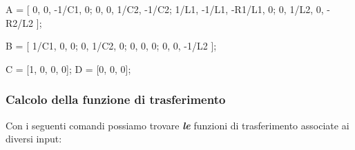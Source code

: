 \documentclass[
]{article}
\newenvironment{Shaded}{}{}
\newcommand{\FloatTok}[1]{\textcolor[rgb]{0.25,0.63,0.44}{#1}}
\newcommand{\NormalTok}[1]{#1}
\newcommand{\OperatorTok}[1]{\textcolor[rgb]{0.40,0.40,0.40}{#1}}
\newcommand{\VariableTok}[1]{\textcolor[rgb]{0.10,0.09,0.49}{#1}}
\begin{document}
\begin{Shaded}
\begin{Highlighting}[]
\VariableTok{A} \OperatorTok{=}\NormalTok{ [   }\FloatTok{0}\OperatorTok{,}      \FloatTok{0}\OperatorTok{,}      \OperatorTok{{-}}\FloatTok{1}\OperatorTok{/}\VariableTok{C1}\OperatorTok{,}      \FloatTok{0}\OperatorTok{;}
        \FloatTok{0}\OperatorTok{,}      \FloatTok{0}\OperatorTok{,}      \FloatTok{1}\OperatorTok{/}\VariableTok{C2}\OperatorTok{,}       \OperatorTok{{-}}\FloatTok{1}\OperatorTok{/}\VariableTok{C2}\OperatorTok{;}
        \FloatTok{1}\OperatorTok{/}\VariableTok{L1}\OperatorTok{,}   \OperatorTok{{-}}\FloatTok{1}\OperatorTok{/}\VariableTok{L1}\OperatorTok{,}  \OperatorTok{{-}}\VariableTok{R1}\OperatorTok{/}\VariableTok{L1}\OperatorTok{,}      \FloatTok{0}\OperatorTok{;}
        \FloatTok{0}\OperatorTok{,}      \FloatTok{1}\OperatorTok{/}\VariableTok{L2}\OperatorTok{,}   \FloatTok{0}\OperatorTok{,}          \OperatorTok{{-}}\VariableTok{R2}\OperatorTok{/}\VariableTok{L2}
\NormalTok{    ]}\OperatorTok{;}

\VariableTok{B} \OperatorTok{=}\NormalTok{ [   }\FloatTok{1}\OperatorTok{/}\VariableTok{C1}\OperatorTok{,}   \FloatTok{0}\OperatorTok{,}      \FloatTok{0}\OperatorTok{;}
        \FloatTok{0}\OperatorTok{,}      \FloatTok{1}\OperatorTok{/}\VariableTok{C2}\OperatorTok{,}   \FloatTok{0}\OperatorTok{;}
        \FloatTok{0}\OperatorTok{,}      \FloatTok{0}\OperatorTok{,}      \FloatTok{0}\OperatorTok{;}
        \FloatTok{0}\OperatorTok{,}      \FloatTok{0}\OperatorTok{,}      \OperatorTok{{-}}\FloatTok{1}\OperatorTok{/}\VariableTok{L2}
\NormalTok{    ]}\OperatorTok{;}

\VariableTok{C} \OperatorTok{=}\NormalTok{ [}\FloatTok{1}\OperatorTok{,} \FloatTok{0}\OperatorTok{,} \FloatTok{0}\OperatorTok{,} \FloatTok{0}\NormalTok{]}\OperatorTok{;}
\VariableTok{D} \OperatorTok{=}\NormalTok{ [}\FloatTok{0}\OperatorTok{,} \FloatTok{0}\OperatorTok{,} \FloatTok{0}\NormalTok{]}\OperatorTok{;}
\end{Highlighting}
\end{Shaded}

\hypertarget{calcolo-della-funzione-di-trasferimento}{%
\subsubsection{Calcolo della funzione di
trasferimento}\label{calcolo-della-funzione-di-trasferimento}}

Con i seguenti comandi possiamo trovare \emph{\textbf{le}} funzioni di
trasferimento associate ai diversi input:
\end{document}
